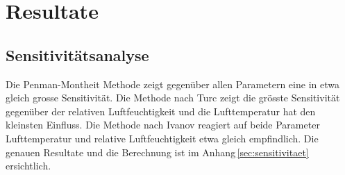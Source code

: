 \section{Resultate}




\subsection{Sensitivitätsanalyse}
Die Penman-Montheit Methode zeigt gegenüber allen Parametern eine in etwa gleich grosse Sensitivität. Die Methode nach Turc zeigt die grösste Sensitivität gegenüber der relativen Luftfeuchtigkeit und die Lufttemperatur hat den kleinsten Einfluss. Die Methode nach Ivanov reagiert auf beide Parameter Lufttemperatur und relative Luftfeuchtigkeit etwa gleich empfindlich. Die genauen Resultate und die Berechnung ist im Anhang\,\ref{sec:sensitivitaet} ersichtlich.